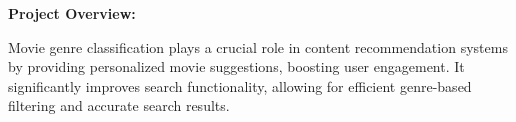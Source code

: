 \documentclass[hbrs-poster.tex]{subfiles}
\begin{document}
    {
    
        \textbf{Project Overview:}

        Movie genre classification plays a crucial role in content recommendation systems by providing personalized movie suggestions, boosting user engagement. It significantly improves search functionality, allowing for efficient genre-based filtering and accurate search results. 

}
\end{document}
